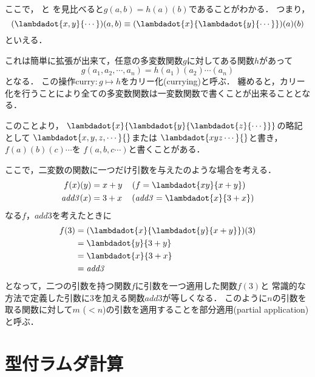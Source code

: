 \documentclass[a4paper,titlepage,report]{jsbook}
\begin{document}
ここで，
と
を見比べると$g(a, b) = h(a)(b)$であることがわかる．
つまり，
\begin{equation}
(\lambdadot{x,y}{\cdots})(a,b) \equiv (\lambdadot{x}{\lambdadot{y}{\cdots}})(a)(b)
\end{equation}
といえる．

これは簡単に拡張が出来て，任意の多変数関数$g$に対してある関数$h$があって
\begin{equation}
g(a_1, a_2, \cdots, a_n)= h(a_1)(a_2)\cdots(a_n)
\end{equation}
となる．
この操作$\mathrm{curry}: g\mapsto h$をカリー化(currying)と呼ぶ．
纏めると，カリー化を行うことにより全ての多変数関数は一変数関数で書くことが出来ることとなる．

このことより，
$\lambdadot{x}{\lambdadot{y}{\lambdadot{z}{\cdots}}}$の略記として
$\lambdadot{x,y,z,\cdots}{}$または
$\lambdadot{xyz\cdots}{}$と書き，
$f(a)(b)(c)\cdots$を
$f(a,b,c\cdots)$と書くことがある．

ここで，二変数の関数に一つだけ引数を与えたのような場合を考える．
\begin{align}
f (x)(y) &= x + y \quad \left(f = \lambdadot{xy}{x + y}\right) \\
\mathit{add3}(x)   &= 3 + x \quad \left(\mathit{add3} = \lambdadot{x}{3 + x}\right) \\
\end{align}
なる$f$，$\mathit{add3}$を考えたときに
\begin{align}
\begin{aligned}
f(3)            &= (\lambdadot{x}{\lambdadot{y}{x+y}})(3) \\
                &= \lambdadot{y}{3 + y} \\
                &= \lambdadot{x}{3 + x} \\
                &= \mathit{add3}
\end{aligned}
\end{align}
となって，二つの引数を持つ関数$f$に引数を一つ適用した関数$f(3)$と
常識的な方法で定義した引数に3を加える関数$\mathit{add3}$が等しくなる．
このように$n$の引数を取る関数に対して$m$ ($<n$)の引数を適用することを部分適用(partial application)と呼ぶ．

\section{型付ラムダ計算}\label{sc:about-typed-lambda-calculus}
\end{document}
